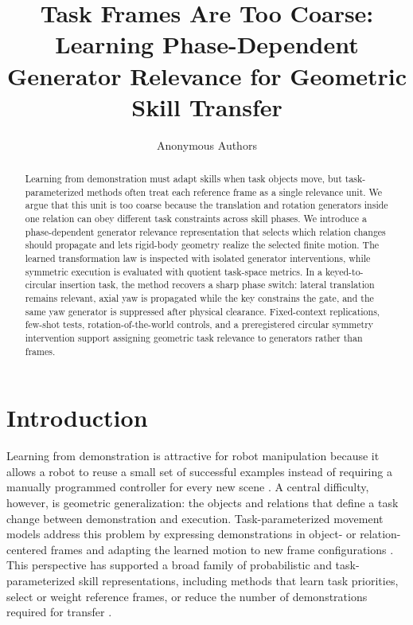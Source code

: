 \documentclass[letterpaper,10pt,conference]{ieeeconf}
\title{\LARGE \bf
Task Frames Are Too Coarse:
Learning Phase-Dependent Generator Relevance for Geometric Skill Transfer
}
\author{Anonymous Authors}
\begin{document}
\maketitle

\begin{abstract}
Learning from demonstration must adapt skills when task objects move, but
task-parameterized methods often treat each reference frame as a single
relevance unit. We argue that this unit is too coarse because the translation
and rotation generators inside one relation can obey different task constraints
across skill phases. We introduce a phase-dependent generator relevance
representation that selects which relation changes should propagate and lets
rigid-body geometry realize the selected finite motion. The learned
transformation law is inspected with isolated generator interventions, while
symmetric execution is evaluated with quotient task-space metrics. In a
keyed-to-circular insertion task, the method recovers a sharp phase switch:
lateral translation remains relevant, axial yaw is propagated while the key
constrains the gate, and the same yaw generator is suppressed after physical
clearance. Fixed-context replications, few-shot tests, rotation-of-the-world
controls, and a preregistered circular symmetry intervention support assigning
geometric task relevance to generators rather than frames.
\end{abstract}

\section{Introduction}
\label{sec:intro}

Learning from demonstration is attractive for robot manipulation because it
allows a robot to reuse a small set of successful examples instead of requiring
a manually programmed controller for every new scene
\cite{Argall2009Survey,Ravichandar2020Recent}. A central difficulty,
however, is geometric generalization: the objects and relations that define a
task change between demonstration and execution. Task-parameterized movement
models address this problem by expressing demonstrations in object- or
relation-centered frames and adapting the learned motion to new frame
configurations \cite{Calinon2016Tutorial,Calinon2014TPGMM,Calinon2018TPModels}.
This perspective has supported a broad family of probabilistic and
task-parameterized skill representations, including methods that learn task
priorities, select or weight reference frames, or reduce the number of
demonstrations required for transfer
\cite{Huang2018GeneralizedTP,Silverio2019TaskPriorities,Sena2019FrameWeighted,
Zhu2022FewTP,Sun2024FrameWeighted,Montero2024TPGP}.
\end{document}
